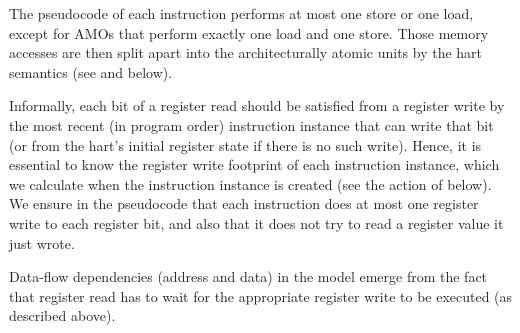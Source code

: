 The pseudocode of each instruction performs at most one store or one load, except for AMOs that perform exactly one load and one store.
Those memory accesses are then split apart into the architecturally atomic units by the hart semantics (see  and  below).

Informally, each bit of a register read should be satisfied from a register write by the most recent (in program order) instruction instance that can write that bit (or from the hart's initial register state if there is no such write).
Hence, it is essential to know the register write footprint of each instruction instance, which we calculate when the instruction instance is created (see the action of  below).
We ensure in the pseudocode that each instruction does at most one register write to each register bit, and also that it does not try to read a register value it just wrote.

Data-flow dependencies (address and data) in the model emerge from the fact that register read has to wait for the appropriate register write to be executed (as described above).

